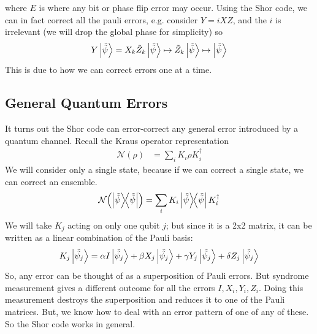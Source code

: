 where $E$ is where any bit or phase flip error may occur. Using the Shor code, we can in fact correct
all the pauli errors, e.g. consider $Y = i XZ$, and the $i$ is irrelevant (we will drop the global phase for simplicity) so \[ Y \ket{\tilde{\tilde{\psi}}} = X_k \tilde{Z}_k \ket{\tilde{\tilde{\psi}}} \mapsto \tilde{Z}_k \ket{\tilde{\tilde{\psi}}} \mapsto \ket{\tilde{\tilde{\psi}}}\]
This is due to how we can correct errors one at a time.

\subsection{General Quantum Errors}
It turns out the Shor code can error-correct any general error introduced by a quantum channel.
Recall the Kraus operator representation
\begin{align*}
    \mathcal{N}(\rho) &= \sum_i K_i \rho K_i^{\dagger}
\end{align*}
We will consider only a single state, because if we can correct a single state, we can correct an ensemble.
\[ \mathcal{N}\qty(\ketbra{\tilde{\tilde{\psi}}}) = \sum_i K_i \ketbra{\tilde{\tilde{\psi}}} K_i^{\dagger} \]
We will take $K_j$ acting on only one qubit $j$; but since it is a 2x2 matrix, it can be written
as a linear combination of the Pauli basis:
\[ K_j \ket{\tilde{\tilde{\psi_j}}} = \alpha I \ket{\tilde{\tilde{\psi_j}}} + \beta X_j \ket{\tilde{\tilde{\psi_j}}} + \gamma Y_j \ket{\tilde{\tilde{\psi_j}}} + \delta Z_j \ket{\tilde{\tilde{\psi_j}}} \]
So, any error can be thought of as a superposition of Pauli errors.
But syndrome measurement gives a different outcome for all the errors $I, X_i, Y_i, Z_i$.
Doing this measurement destroys the superposition and reduces it to one of the Pauli matrices. But, we know how to deal with an error pattern of one of any of these.
So the Shor code works in general.
